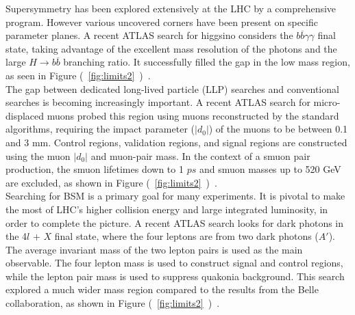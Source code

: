 \documentclass{moriond}
\begin{document}
Supersymmetry has been explored extensively at the LHC by a comprehensive
program. However various uncovered corners have been present on specific
parameter planes. A recent ATLAS search for higgsino considers the
$b\overline{b}\gamma\gamma$ final state, taking advantage of the excellent mass
resolution of the photons and the large $H\rightarrow b\overline{b}$ branching
ratio. It successfully filled the gap in the low mass region, as seen in Figure
(~\ref{fig:limits2}~)~\cite{bbyy}.\\

The gap between dedicated long-lived particle (LLP) searches and conventional
searches is becoming increasingly important. A recent ATLAS search for
micro-displaced muons probed this region using muons reconstructed by the
standard algorithms, requiring the impact parameter ($|d_{0}|$) of the muons to
be between 0.1 and 3 mm. Control regions, validation regions, and signal
regions are constructed using the muon $|d_{0}|$ and muon-pair mass. In the
context of a smuon pair production, the smuon lifetimes down to 1 $ps$ and
smuon masses up to 520 GeV are excluded, as shown in Figure
(~\ref{fig:limits2}~)~\cite{micro}.\\   

Searching for BSM is a primary goal for many experiments. It is pivotal to make
the most of LHC's higher collision energy and large integrated luminosity, in
order to complete the picture. A recent ATLAS search looks for dark photons in
the 4$l$ + $X$ final state, where the four leptons are from two dark photons
($A'$). The average invariant mass of the two lepton pairs is used as the main
observable. The four lepton mass is used to construct signal and control
regions, while the lepton pair mass is used to suppress quakonia background.
This search explored a much wider mass region compared to the results from the
Belle collaboration, as shown in Figure
(~\ref{fig:limits2}~)~\cite{dark}.\\ 
\end{document}
